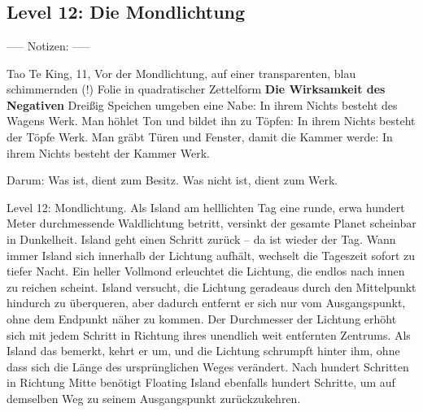 \chapter{}











\chapter{}

\section{Level 12: Die Mondlichtung}

----- Notizen: -----

Tao Te King, 11, Vor der Mondlichtung, auf einer transparenten, blau schimmernden (!) Folie in quadratischer Zettelform
\textbf{Die Wirksamkeit des Negativen}
Dreißig Speichen umgeben eine Nabe:
In ihrem Nichts besteht des Wagens Werk.
Man höhlet Ton und bildet ihn zu Töpfen:
In ihrem Nichts besteht der Töpfe Werk.
Man gräbt Türen und Fenster, damit die Kammer werde:
In ihrem Nichts besteht der Kammer Werk.

Darum: Was ist, dient zum Besitz.
Was nicht ist, dient zum Werk.

    Level 12: Mondlichtung. Als Island am helllichten Tag eine runde, erwa hundert Meter durchmessende Waldlichtung betritt, versinkt der gesamte Planet scheinbar in Dunkelheit. Island geht einen Schritt zurück – da ist wieder der Tag. Wann immer Island sich innerhalb der Lichtung aufhält, wechselt die Tageszeit sofort zu tiefer Nacht. Ein heller Vollmond erleuchtet die Lichtung, die endlos nach innen zu reichen scheint. Island versucht, die Lichtung geradeaus durch den Mittelpunkt hindurch zu überqueren, aber dadurch entfernt er sich nur vom Ausgangspunkt, ohne dem Endpunkt näher zu kommen. Der Durchmesser der Lichtung erhöht sich mit jedem Schritt in Richtung ihres unendlich weit entfernten Zentrums. Als Island das bemerkt, kehrt er um, und die Lichtung schrumpft hinter ihm, ohne dass sich die Länge des ursprünglichen Weges verändert. Nach hundert Schritten in Richtung Mitte benötigt Floating Island ebenfalls hundert Schritte, um auf demselben Weg zu seinem Ausgangspunkt zurückzukehren.

